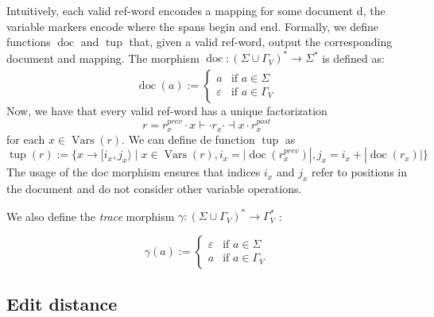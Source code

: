 \documentclass{article}
\newcommand{\Vars}{\operatorname{Vars}}
\newcommand{\doc}{\operatorname{doc}}
\newcommand{\tup}{\operatorname{tup}}
\begin{document}
Intuitively, each valid ref-word encondes a mapping for some document d, the variable markers encode where the spans begin and end. Formally, we define functions $\doc$ and $\tup$ that, given a valid ref-word, output the corresponding document and mapping. The morphism $\doc: (\Sigma \cup \Gamma_V)^* \xrightarrow[]{} \Sigma^*$ is defined as:
\[
\doc(a) :=
\begin{cases}
a & \text{if } a \in \Sigma \\[6pt]
\varepsilon & \text{if } a \in \Gamma_V
\end{cases}
\]
Now, we have that every valid ref-word has a unique factorization
\[
r = r_x^{prev} \cdot x\vdash \cdot r_x \cdot \dashv x \cdot r_x^{post}
\] 
for each $x \in \Vars(r)$. We can define de function $\tup$ as 
\[
\tup(r) := \{x \xrightarrow[]{} [i_x, j_x\rangle \; | \; x \in \Vars(r), i_x = |\doc(r^{prev}_x)|, j_x = i_x + |\doc(r_x)|\}
\]
The usage of the doc morphism ensures that indices $i_x$ and $j_x$  refer to positions in the document and do not consider other variable operations. 

We also define the \emph{trace} morphism $\gamma:(\Sigma \cup \Gamma_V)^* \to \Gamma_V^*$ :

\[
\gamma(a) :=
\begin{cases}
\varepsilon & \text{if } a \in \Sigma \\[6pt]
a & \text{if } a \in \Gamma_V
\end{cases}
\]

\subsection{Edit distance}
\end{document}
